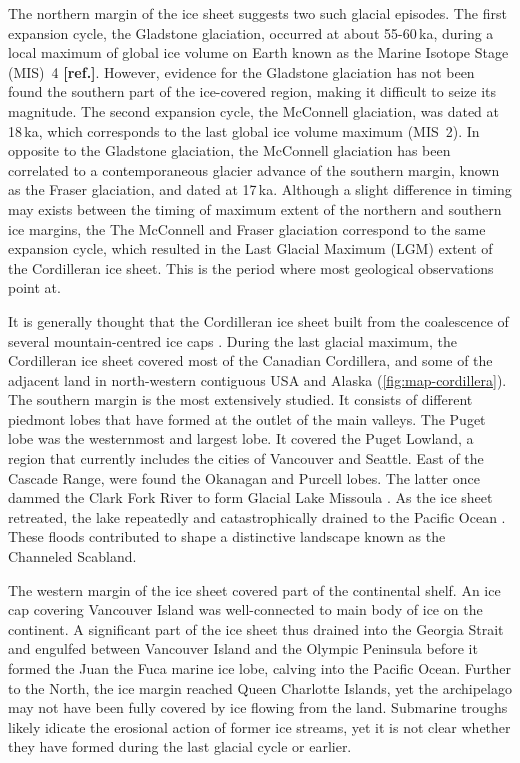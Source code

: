 \documentclass{article}
\newcommand{\mref}[0]{\textbf{[ref.]}}
\begin{document}
The northern margin of the ice sheet suggests two such glacial episodes. The
first expansion cycle, the Gladstone glaciation, occurred at about 55-60\,ka,
during a local maximum of global ice volume on Earth known as the Marine
Isotope Stage (MIS)~4 \mref. However, evidence for the Gladstone glaciation has
not been found the southern part of the ice-covered region, making it difficult
to seize its magnitude. The second expansion cycle, the McConnell glaciation,
was dated at 18\,ka, which corresponds to the last global ice volume maximum
(MIS~2). In opposite to the Gladstone glaciation, the McConnell glaciation has
been correlated to a contemporaneous glacier advance of the southern margin,
known as the Fraser glaciation, and dated at 17\,ka. Although a slight
difference in timing may exists between the timing of maximum extent of the
northern and southern ice margins, the The McConnell and Fraser glaciation
correspond to the same expansion cycle, which resulted in the Last Glacial
Maximum (LGM) extent of the Cordilleran ice sheet. This is the period where
most geological observations point at.

It is generally thought that the Cordilleran ice sheet built from the
coalescence of several mountain-centred ice caps \citep{Davis.Mathews.1944}.
During the last glacial maximum, the Cordilleran ice sheet covered most of the
Canadian Cordillera, and some of the adjacent land in north-western contiguous
USA and Alaska (\cref{fig:map-cordillera}). The southern margin is the most
extensively studied. It consists of different piedmont lobes that have formed
at the outlet of the main valleys. The Puget lobe was the westernmost and
largest lobe. It covered the Puget Lowland, a region that currently includes
the cities of Vancouver and Seattle. East of the Cascade Range, were found the
Okanagan and Purcell lobes. The latter once dammed the Clark Fork River to form
Glacial Lake Missoula \citep{Pardee.1910}. As the ice sheet retreated, the lake
repeatedly and catastrophically drained to the Pacific Ocean
\citep{Bretz.1923,Waitt.1980}. These floods
contributed to shape a distinctive landscape known as the Channeled Scabland.

The western margin of the ice sheet covered part of the continental shelf. An
ice cap covering Vancouver Island was well-connected to main body of ice on the
continent. A significant part of the ice sheet thus drained into the Georgia
Strait and engulfed between Vancouver Island and the Olympic Peninsula before
it formed the Juan the Fuca marine ice lobe, calving into the Pacific Ocean.
Further to the North, the ice margin reached Queen Charlotte Islands, yet the
archipelago may not have been fully covered by ice
flowing from the land. Submarine troughs likely idicate the erosional action of
former ice streams, yet it is not clear whether they have formed during the
last glacial cycle or earlier.
\end{document}
